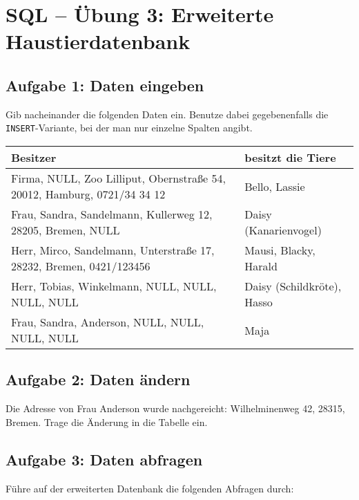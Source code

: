 \clearpage

\section{SQL -- Übung 3: Erweiterte Haustierdatenbank}

\subsection{Aufgabe 1: Daten eingeben}

Gib nacheinander die folgenden Daten ein. Benutze dabei gegebenenfalls die
\lstinline{INSERT}-Variante, bei der man nur einzelne Spalten angibt.

\begin{center}
\begin{tabular}{|l|l|}
\hline
\textbf{Besitzer} & \textbf{besitzt die Tiere} \\ 
\hline
Firma, NULL, Zoo Lilliput, Obernstraße 54, 20012, Hamburg, 0721/34 34 12 &
Bello, Lassie\\
\hline
Frau, Sandra, Sandelmann, Kullerweg 12, 28205, Bremen, NULL & 
Daisy (Kanarienvogel)\\
\hline
Herr, Mirco, Sandelmann, Unterstraße 17, 28232, Bremen, 0421/123456 &
Mausi, Blacky, Harald \\
\hline
Herr, Tobias, Winkelmann, NULL, NULL, NULL, NULL &
Daisy (Schildkröte), Hasso\\
\hline
Frau, Sandra, Anderson, NULL, NULL, NULL, NULL &
Maja\\
\hline
\end{tabular}
\end{center}


\subsection{Aufgabe 2: Daten ändern}

Die Adresse von Frau Anderson wurde nachgereicht: Wilhelminenweg 42, 28315,
Bremen. Trage die Änderung in die Tabelle  ein.


\subsection{Aufgabe 3: Daten abfragen}

Führe auf der erweiterten Datenbank die folgenden Abfragen durch:

